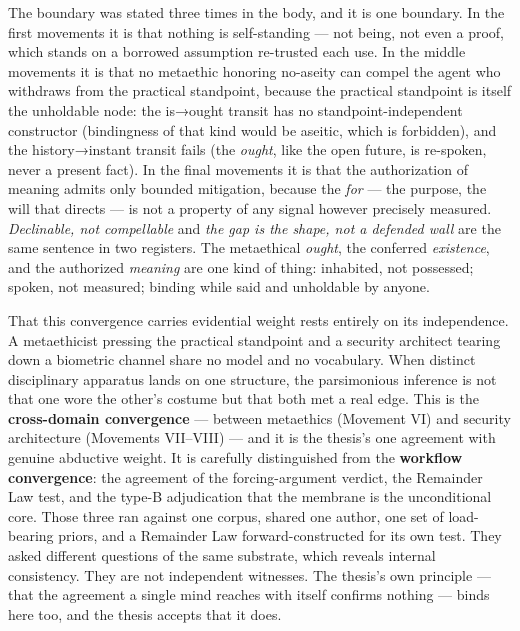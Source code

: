 \documentclass[11pt]{article}
\begin{document}
The boundary was stated three times in the body, and it is one boundary. In the first movements it is that nothing is self-standing — not being, not even a proof, which stands on a borrowed assumption re-trusted each use. In the middle movements it is that no metaethic honoring no-aseity can compel the agent who withdraws from the practical standpoint, because the practical standpoint is itself the unholdable node: the is→ought transit has no standpoint-independent constructor (bindingness of that kind would be aseitic, which is forbidden), and the history→instant transit fails (the \emph{ought}, like the open future, is re-spoken, never a present fact). In the final movements it is that the authorization of meaning admits only bounded mitigation, because the \emph{for} — the purpose, the will that directs — is not a property of any signal however precisely measured. \emph{Declinable, not compellable} and \emph{the gap is the shape, not a defended wall} are the same sentence in two registers. The metaethical \emph{ought}, the conferred \emph{existence}, and the authorized \emph{meaning} are one kind of thing: inhabited, not possessed; spoken, not measured; binding while said and unholdable by anyone.

That this convergence carries evidential weight rests entirely on its independence. A metaethicist pressing the practical standpoint and a security architect tearing down a biometric channel share no model and no vocabulary. When distinct disciplinary apparatus lands on one structure, the parsimonious inference is not that one wore the other's costume but that both met a real edge. This is the \textbf{cross-domain convergence} — between metaethics (Movement VI) and security architecture (Movements VII–VIII) — and it is the thesis's one agreement with genuine abductive weight. It is carefully distinguished from the \textbf{workflow convergence}: the agreement of the forcing-argument verdict, the Remainder Law test, and the type-B adjudication that the membrane is the unconditional core. Those three ran against one corpus, shared one author, one set of load-bearing priors, and a Remainder Law forward-constructed for its own test. They asked different questions of the same substrate, which reveals internal consistency. They are not independent witnesses. The thesis's own principle — that the agreement a single mind reaches with itself confirms nothing — binds here too, and the thesis accepts that it does.
\end{document}
